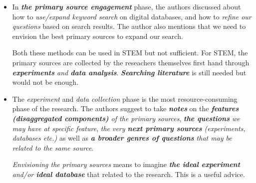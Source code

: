 \documentclass[11pt]{article}
\begin{document}
\begin{itemize}
\begin{itemize}
\item In \emph{\textbf{the primary source engagement}} phase, the authors discussed about how to \emph{use/expand keyword search} on digital databases, and how to \emph{refine our questions} based on search results.  The author also mentions that we need to envision the best primary sources to expand our search. 

Both these methods can be used in STEM but not sufficient. For STEM, the primary sources are collected by the reseachers themselves first hand through \emph{\textbf{experiments} and \textbf{data analysis}}. \emph{\textbf{Searching literature}} is still needed but would not be enough. 

\item The \emph{experiment} and \emph{data collection} phase is the most resource-consuming phase of the research. The authors suggest to take \emph{\textbf{notes}} on the \emph{\textbf{features (disaggregated components)} of the primary sources}, \emph{\textbf{the questions} we may have at specific feature}, \emph{the very \textbf{next primary sources} (experiments, databases etc.)} as well as \emph{\textbf{a broader genres of questions} that may be related to the same source}. 

\emph{Envisioning the primary sources} means to imagine \emph{\textbf{the ideal experiment} and/or \textbf{ideal database}} that related to the research. This is a useful advice. 
\end{itemize}
\end{itemize}
\end{document}
